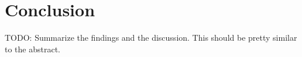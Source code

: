 

\section{Conclusion}
TODO: Summarize the findings and the discussion. This should be pretty similar to the abstract.